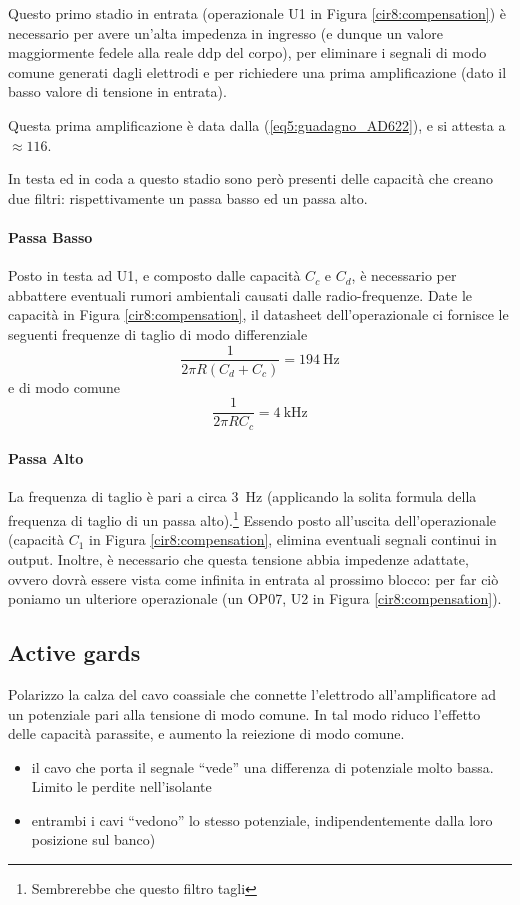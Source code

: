 Questo primo stadio in entrata (operazionale U1 in Figura \ref{cir8:compensation}) è necessario per avere un'alta impedenza in ingresso (e dunque un valore maggiormente fedele alla reale ddp del corpo), per eliminare i segnali di modo comune generati dagli elettrodi e per richiedere una prima amplificazione (dato il basso valore di tensione in entrata).

Questa prima amplificazione è data dalla (\ref{eq5:guadagno_AD622}), e si attesta a $\approx 116$.

In testa ed in coda a questo stadio sono però presenti delle capacità che creano due filtri: rispettivamente un passa basso ed un passa alto.

\paragraph{Passa Basso} Posto in testa ad U1, e composto dalle capacità $C_c$ e $C_d$, è necessario per abbattere eventuali rumori ambientali causati dalle radio-frequenze. Date le capacità in Figura \ref{cir8:compensation}, il datasheet dell'operazionale ci fornisce le seguenti frequenze di taglio di modo differenziale
\begin{equation*}
	\frac{1}{2 \pi R ( C_d + C_c ) } = \SI{194}{\Hz}
\end{equation*}
e di modo comune
\begin{equation*}
	\frac{1}{2 \pi R C_c} = \SI{4}{\kHz}
\end{equation*}

\paragraph{Passa Alto} La frequenza di taglio è pari a circa \SI{3}{\Hz} (applicando la solita formula della frequenza di taglio di un passa alto).\footnote{Sembrerebbe che questo filtro tagli} Essendo posto all'uscita dell'operazionale (capacità $C_1$ in Figura \ref{cir8:compensation}, elimina eventuali segnali continui in output. Inoltre, è necessario che questa tensione abbia impedenze adattate, ovvero dovrà essere vista come infinita in entrata al prossimo blocco: per far ciò poniamo un ulteriore operazionale (un OP07, U2 in Figura \ref{cir8:compensation}).

\subsection{Active gards}
Polarizzo la calza del cavo coassiale che connette l’elettrodo all’amplificatore ad un
potenziale pari alla tensione di modo comune.
In tal modo riduco l’effetto delle capacità parassite, e aumento la reiezione di modo
comune.
\begin{itemize}
\item il cavo che porta il segnale “vede” una differenza di potenziale molto bassa. Limito le
perdite nell’isolante
\item entrambi i cavi “vedono” lo stesso potenziale, indipendentemente dalla loro posizione sul
banco)
\end{itemize}

